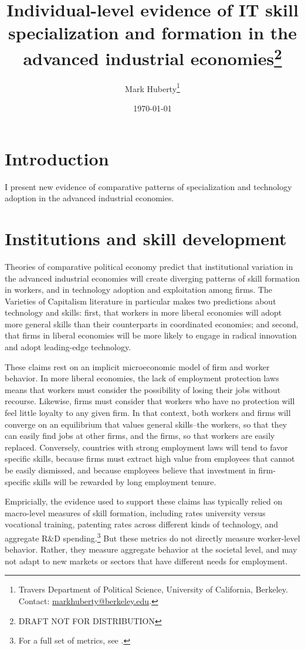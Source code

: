 \documentclass[11pt]{article}
\title{Individual-level evidence of IT skill specialization and formation
  in the advanced industrial economies\thanks{DRAFT NOT FOR DISTRIBUTION}}
\author{Mark Huberty\thanks{Travers Department of Political Science,
    University of California, Berkeley. Contact:
    \url{markhuberty@berkeley.edu}.}}
\date{\today}
\begin{document}
\maketitle
\doublespacing

\section{Introduction}
\label{sec:introduction}
 
I present new evidence of comparative patterns of specialization and
technology adoption in the advanced industrial economies. 

\section{Institutions and skill development}
\label{sec:inst-skill-devel}


Theories of comparative political economy predict that institutional
variation in the advanced industrial economies will create diverging
patterns of skill formation in workers, and in technology adoption and
exploitation among firms. The Varieties of Capitalism literature in
particular \citep{Hall:2001} makes two predictions about technology
and skills: first, that workers in more liberal economies
will adopt more general skills than their counterparts in coordinated
economies; and second, that firms in liberal economies will be more
likely to engage in radical innovation and adopt leading-edge
technology. 

These claims rest on an implicit microeconomic model of firm and
worker behavior. In more liberal economies, the lack of employment
protection laws means that workers must consider the possibility of
losing their jobs without recourse. Likewise, firms must consider that
workers who have no protection will feel little loyalty to any given
firm. In that context, both workers and firms will converge on an
equilibrium that values general skills--the workers, so that they can
easily find jobs at other firms, and the firms, so that workers are
easily replaced. Conversely, countries with strong employment laws
will tend to favor specific skills, because firms must extract high
value from employees that cannot be easily dismissed, and because
employees believe that investment in firm-specific skills will be
rewarded by long employment tenure. 

Empricially, the evidence used to support these claims has typically
relied on macro-level measures of skill formation, including
rates university versus vocational training, patenting rates across
different kinds of technology, and aggregate R\&D
spending.\footnote{For a full set of metrics, see
  \cite{hall2009varieties}.} But these metrics do not directly measure
worker-level behavior. Rather, they measure aggregate behavior at the
societal level, and may not adapt to new markets or sectors that have
different needs for employment.
\end{document}
